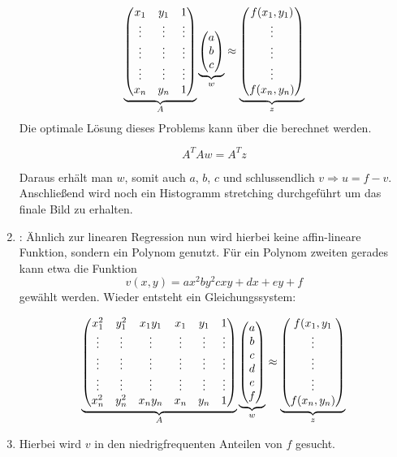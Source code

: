 \begin{enumerate}[label = \alph*)]
    \[\underbrace{\begin{pmatrix} x_1 & y_1 & 1 \\ \vdots & \vdots & \vdots \\ \vdots & \vdots & \vdots \\ \vdots & \vdots & \vdots \\ x_n & y_n & 1 \end{pmatrix}}_{A} \underbrace{\begin{pmatrix} a \\ b \\ c \end{pmatrix}}_{w} \approx \underbrace{\begin{pmatrix} f(x_1,y_1) \\ \vdots \\ \vdots \\ \vdots \\ f(x_n,y_n) \end{pmatrix}}_{z}\]
    Die optimale Lösung dieses Problems kann über die  berechnet werden.

    \[A^T A w = A^T z\]

    Daraus erhält man $w$, somit auch $a$, $b$, $c$ und schlussendlich $v \Rightarrow u = f-v$.\\
    Anschließend wird noch ein Histogramm stretching durchgeführt um das finale Bild zu erhalten.

    \item {}:
    Ähnlich zur linearen Regression nun wird hierbei keine affin-lineare Funktion, sondern ein Polynom genutzt. Für ein Polynom zweiten gerades kann etwa die Funktion
    \[v(x,y) = ax^2 by^2 cxy+ dx +ey +f\]
    gewählt werden. Wieder entsteht ein Gleichungssystem:

    \[\underbrace{\begin{pmatrix} x_1^2 & y_1^2 & x_1y_1 & x_1 & y_1 & 1 \\ \vdots & \vdots & \vdots & \vdots & \vdots & \vdots \\ \vdots & \vdots & \vdots & \vdots & \vdots & \vdots \\ \vdots & \vdots & \vdots & \vdots & \vdots & \vdots \\ x_n^2 & y_n^2 & x_ny_n & x_n & y_n & 1 \end{pmatrix}}_{A} \underbrace{\begin{pmatrix} a \\ b \\ c \\ d \\e \\ f \end{pmatrix}}_{w} \approx \underbrace{\begin{pmatrix} f(x_1,y_1 \\ \vdots \\ \vdots \\ \vdots \\ f(x_n,y_n) \end{pmatrix}}_{z}\]

  \item {}
  Hierbei wird $v$ in den niedrigfrequenten Anteilen von $f$ gesucht.


\end{enumerate}
